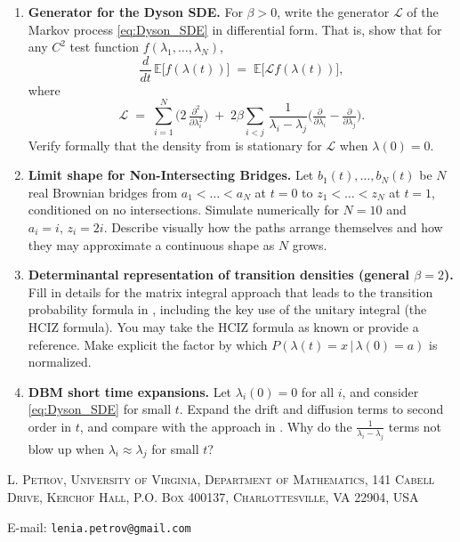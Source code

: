 \documentclass[letterpaper,11pt,oneside,reqno]{article}
\numberwithin{equation}{section}
\theoremstyle{definition}
\begin{document}
\newpage

\begin{enumerate}[1.]



\item \textbf{Generator for the Dyson SDE.} For $\beta>0$, write the generator $\mathcal{L}$ of the Markov process \eqref{eq:Dyson_SDE} in differential form. That is, show that for any $C^2$ test function $f(\lambda_1,\dots,\lambda_N)$,
\[
\frac{d}{dt}\,\mathbb{E}\bigl[f(\lambda(t))\bigr]
\;=\;\mathbb{E}\bigl[\mathcal{L}f(\lambda(t))\bigr],
\]
where
\[
\mathcal{L} \;=\; \sum_{i=1}^N \bigl(2\,\tfrac{\partial^2}{\partial \lambda_i^2}\bigr)
\;+\;2\beta\sum_{i<j}\,\frac{1}{\lambda_i-\lambda_j}\bigl(\tfrac{\partial}{\partial \lambda_i}-\tfrac{\partial}{\partial \lambda_j}\bigr).
\]
Verify formally that the density from  is stationary for $\mathcal{L}$ when $\lambda(0)=0$.



\item \textbf{Limit shape for Non-Intersecting Bridges.} Let $b_1(t),\dots,b_N(t)$ be $N$ real Brownian bridges from $a_1<\dots<a_N$ at $t=0$ to $z_1<\dots<z_N$ at $t=1$, conditioned on no intersections. Simulate numerically for $N=10$ and $a_i=i,\,z_i=2i$. Describe visually how the paths arrange themselves and how they may approximate a continuous shape as $N$ grows.

\item \textbf{Determinantal representation of transition densities (general $\beta=2$).} Fill in details for the matrix integral approach that leads to the transition probability formula in , including the key use of the unitary integral (the HCIZ formula). You may take the HCIZ formula as known or provide a reference. Make explicit the factor by which $P(\lambda(t)=x\,|\,\lambda(0)=a)$ is normalized.

\item \textbf{DBM short time expansions.} Let $\lambda_i(0)=0$ for all $i$, and consider \eqref{eq:Dyson_SDE} for small $t$. Expand the drift and diffusion terms to second order in $t$, and compare with the approach in . Why do the $\tfrac{1}{\lambda_i-\lambda_j}$ terms not blow up when $\lambda_i\approx \lambda_j$ for small $t$?
\end{enumerate}











































\medskip

\textsc{L. Petrov, University of Virginia, Department of Mathematics, 141 Cabell Drive, Kerchof Hall, P.O. Box 400137, Charlottesville, VA 22904, USA}

E-mail: \texttt{lenia.petrov@gmail.com}
\end{document}
